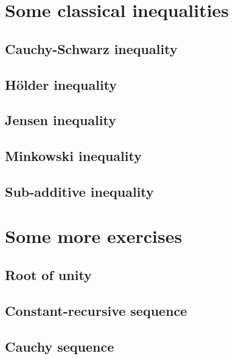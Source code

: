\documentclass[
	fontsize=10pt, %
	twoside=true, %
	secnumdepth=1, %
	numbers=noenddot, %
]{kaobook}
\begin{document}
\chapter{Some classical inequalities}

\section{Cauchy-Schwarz inequality}

\section{Hölder inequality}

\section{Jensen inequality}

\section{Minkowski inequality}

\section{Sub-additive inequality}

\appendix %


\setchapterpreamble[u]{\margintoc}
\chapter{Some more exercises}

\section{Root of unity}\label{Extra:RootUnity}

\section{Constant-recursive sequence}\label{Extra:RecursiveSequence}

\section{Cauchy sequence}
\end{document}
